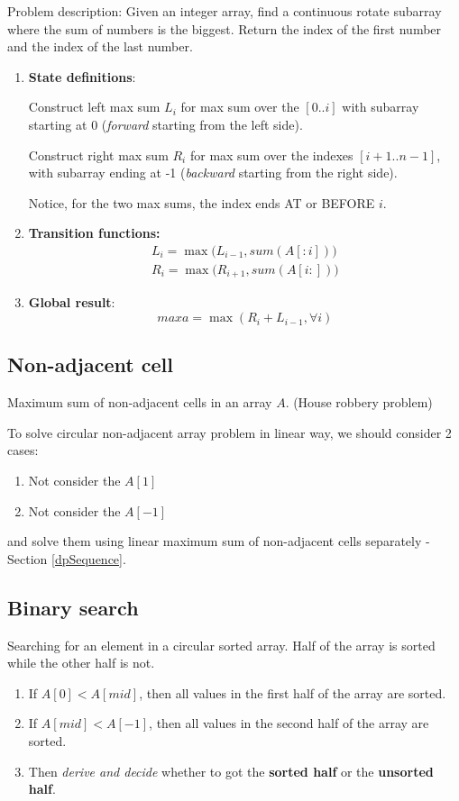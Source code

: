 Problem description: Given an integer array, find a continuous rotate subarray where the sum of numbers is the biggest. Return the index of the first number and the index of the last number. 
\begin{enumerate}
\item \textbf{State definitions}: 

Construct left max sum $L_i$ for max sum over the $[0..i]$ with subarray starting at 0 (\textit{forward} starting from the left side). 

Construct right max sum $R_i$ for max sum over the indexes $[i+1..n -1]$, with subarray ending at -1 (\textit{backward} starting from the right side). 

Notice, for the two max sums, the index ends AT or BEFORE $i$.

\item \textbf{Transition functions:}
\begin{align*}
L_i = \max\Big(L_{i-1}, sum(A[:i])\Big) \\ 
R_i = \max\Big(R_{i+1}, sum(A[i:])\Big)
\end{align*}

\item \textbf{Global result}: 
$$maxa = \max(R_i+L_{i-1}, \forall i)$$
\end{enumerate}

\subsection{Non-adjacent cell}
Maximum sum of non-adjacent cells in an array $A$. (House robbery problem)

To solve circular non-adjacent array problem in linear way, we should consider 2 cases:
\begin{enumerate}
\item Not consider the $A[1]$
\item Not consider the $A[-1]$ 
\end{enumerate}
and solve them using linear maximum sum of non-adjacent cells separately  - Section \ref{dpSequence}. 
\subsection{Binary search}
Searching for an element in a circular sorted array. Half of the array is sorted while the other half is not.
\begin{enumerate}
\item If $A[0] < A[mid]$, then all values in the first half of the array are sorted.
\item If $A[mid] < A[-1]$, then all values in the second half of the array are sorted.
\item Then \textit{derive and decide} whether to got the \textbf{sorted half} or the \textbf{unsorted half}.
\end{enumerate}
